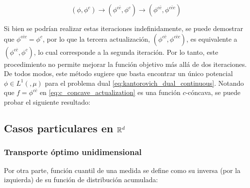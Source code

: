 \begin{equation}
	\label{eq:c_concave_actualization}
	(\phi,\phi^c) \to (\phi^{c\bar c}, \phi^c) \to (\phi^{c\bar c}, \phi^{c\bar c c})
\end{equation}

Si bien se podrían realizar estas iteraciones indefinidamente, se puede demostrar que $\phi^{c\bar c c} = \phi^c$, por lo que la tercera actualización, $(\phi^{c\bar c}, \phi^{c\bar c c})$, es equivalente a $(\phi^{c\bar c}, \phi^c)$, lo cual corresponde a la segunda iteración. Por lo tanto, este procedimiento no permite mejorar la función objetivo más allá de dos iteraciones. De todos modos, este método sugiere que basta encontrar un único potencial $\phi\in L^1(\xspace,\mu)$ para el problema dual \eqref{eq:kantorovich_dual_continuous}. Notando que $f=\phi^{c\bar c}$ en \eqref{eq:c_concave_actualization} es una función $c$-cóncava, se puede probar el siguiente resultado:


\subsection{Casos particulares en \texorpdfstring{$\mathbb{R}^d$}{Rd}}
\label{ot/kantorovich/rd}

\subsubsection{Transporte óptimo unidimensional}

Por otra parte, función cuantil de una medida se define como su inversa (por la izquierda) de su función de distribución acumulada:

